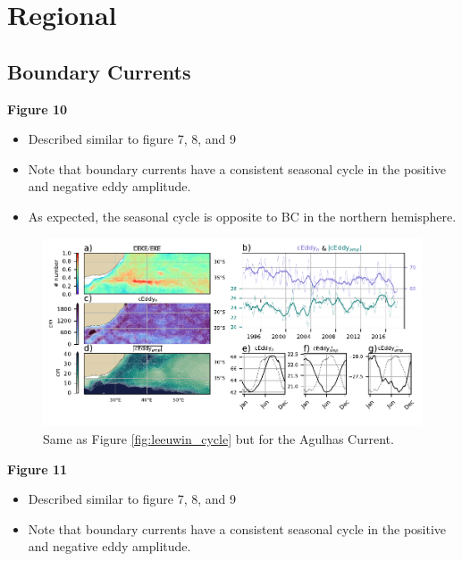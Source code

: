 \documentclass[draft,linenumbers]{agujournal2019}
\begin{document}
	\section{Regional}
	\label{sec:CE_regional_stats}
	\subsection{Boundary Currents}
	


	\textbf{Figure 10}
	\begin{itemize}
		\item Described similar to figure 7, 8, and 9
		\item Note that boundary currents have a consistent seasonal cycle in the positive and negative eddy amplitude.
		\item As expected, the seasonal cycle is opposite to BC in the northern hemisphere.
	\end{itemize}

	\begin{figure}
	    \centering
	    \includegraphics[width=1\textwidth]{figures/regional_ratios_and_stats_V3_2.pdf}
	    \caption{Same as Figure \ref{fig:leeuwin_cycle} but for the Agulhas Current.}
	    \label{fig:south_atlantic_cycle}
	\end{figure}

	\textbf{Figure 11}
	\begin{itemize}
		\item Described similar to figure 7, 8, and 9
		\item Note that boundary currents have a consistent seasonal cycle in the positive and negative eddy amplitude.
	\end{itemize}
\end{document}
